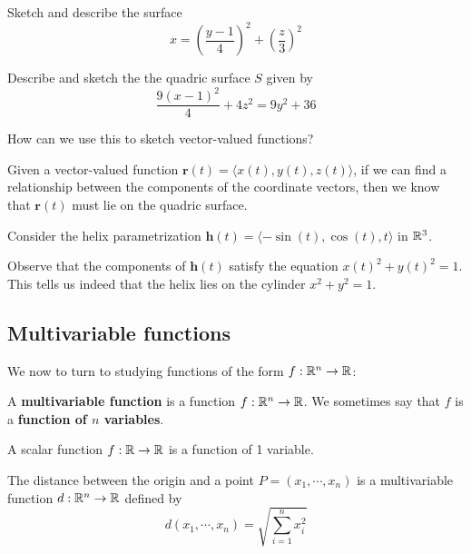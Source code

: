 \begin{example}
Sketch and describe the surface $$x = \left(\frac{y-1}{4}\right)^2 + \left(\frac{z}{3}\right)^2 $$
\end{example}

\begin{example}
Describe and sketch the the quadric surface $S$ given by $$\frac{9(x-1)^2}{4}+4z^2 =9y^2 + 36$$
\end{example}


\begin{motivating}
How can we use this to sketch vector-valued functions?
\end{motivating}


Given a vector-valued function $\bm{r}(t) = \langle x(t), y(t), z(t) \rangle$, if we can find a relationship between the components of the coordinate vectors, then we know that $\bm{r}(t)$ must lie on the quadric surface.

\begin{example}
Consider the helix parametrization $\bm{h}(t) = \langle -\sin(t), \cos(t), t \rangle$ in $\mathbb{R}^3$.

Observe that the components of $\bm{h}(t)$ satisfy the equation $x(t)^2 + y(t)^2 = 1$.  This tells us indeed that the helix lies on the cylinder $x^2 + y^2 = 1$.

\end{example}



\subsection{Multivariable functions}\label{multivariablefunctions}

We now to turn to studying functions of the form $f : \mathbb{R}^n \to \mathbb{R}$:

\begin{definition}
A \textbf{multivariable function} is a function $f : \mathbb{R}^n \to \mathbb{R}$.  We sometimes say that $f$ is a \textbf{function of $n$ variables}.
\end{definition}

\begin{example}
A scalar function $f : \mathbb{R} \to \mathbb{R}$ is a function of 1 variable.
\end{example}

\begin{example}
    The distance between the origin and a point $P = (x_1, \cdots, x_n)$  is a multivariable function $d : \mathbb{R}^n \to \mathbb{R}$ defined by 
    $$d(x_1, \cdots, x_n) = \sqrt{\sum_{i=1}^n x_i^2}$$
\end{example}

